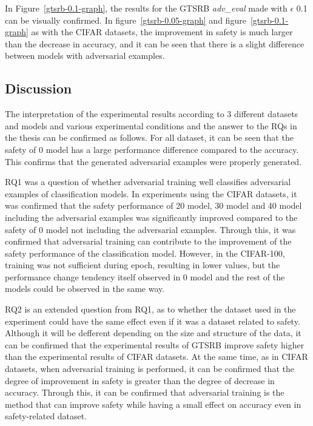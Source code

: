 \documentclass[journal,article,submit,moreauthors,pdftex]{Definitions/mdpi}
\begin{document}
In Figure~\ref{gtsrb-0.1-graph}, the results for the GTSRB {\it adv\_eval} made with \begin{math}\epsilon\end{math} 0.1 can be visually confirmed.
In figure~\ref{gtsrb-0.05-graph} and figure~\ref{gtsrb-0.1-graph} as with the CIFAR datasets, the improvement in safety is much larger than the decrease in accuracy, and it can be seen that there is a slight difference between models with adversarial examples.

\subsection{Discussion}

The interpretation of the experimental results according to 3 different datasets and models and various experimental conditions and the answer to the RQs in the thesis can be confirmed as follows.
For all dataset, it can be seen that the safety of 0 model has a large performance difference compared to the accuracy. This confirms that the generated adversarial examples were properly generated.

RQ1 was a question of whether adversarial training well classifies adversarial examples of classification models.
In experiments using the CIFAR datasets, it was confirmed that the safety performance of 20 model, 30 model and 40 model including the adversarial examples was significantly improved compared to the safety of 0 model not including the adversarial examples.
Through this, it was confirmed that adversarial training can contribute to the improvement of the safety performance of the classification model.
However, in the CIFAR-100, training was not sufficient during epoch, resulting in lower values, but the performance change tendency itself observed in 0 model and the rest of the models could be observed in the same way.

RQ2 is an extended question from RQ1, as to whether the dataset used in the experiment could have the same effect even if it was a dataset related to safety.
Although it will be defferent depending on the size and structure of the data, it can be confirmed that the experimental results of GTSRB improve safety higher than the experimental results of CIFAR datasets.
At the same time, as in CIFAR datasets, when adversarial training is performed, it can be confirmed that the degree of improvement in safety is greater than the degree of decrease in accuracy.
Through this, it can be confirmed that adversarial training is the method that can improve safety while having a small effect on accuracy even in safety-related dataset.
\end{document}
